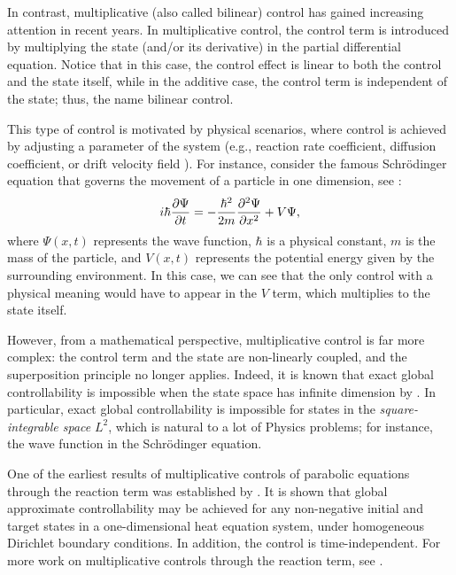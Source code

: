 \documentclass{ifacconf}
\begin{document}
In contrast, multiplicative (also called bilinear) control has gained increasing attention in recent years. In multiplicative control, the control term is introduced by multiplying the state (and/or its derivative) in the partial differential equation. Notice that in this case, the control effect is linear to both the control and the state itself, while in the additive case, the control term is independent of the state; thus, the name bilinear control.

This type of control is motivated by physical scenarios, where control is achieved by adjusting a parameter of the system (e.g., reaction rate coefficient, diffusion coefficient, or drift velocity field ). For instance, consider the famous Schrödinger equation that governs the movement of a particle in one dimension, see \cite{griffiths_introduction_2005}: $$i\hbar \frac{\partial \Psi}{\partial t} = -\frac{\hbar^2}{2m}\frac{\partial ^2\Psi}{\partial x^2} + V\Psi,$$ where $\Psi(x,t)$ represents the wave function, $\hbar$ is a physical constant, $m$ is the mass of the particle, and $V(x,t)$ represents the potential energy given by the surrounding environment. In this case, we can see that the only control with a physical meaning would have to appear in the $V$ term, which multiplies to the state itself.

However, from a mathematical perspective, multiplicative control is far more complex: the control term and the state are non-linearly coupled, and the superposition principle no longer applies. Indeed, it is known that exact global controllability is impossible when the state space has infinite dimension by \cite{ball_controllability_1982}. In particular, exact global controllability is impossible for states in the \textit{square-integrable space} $L^2$, which is natural to a lot of Physics problems; for instance, the wave function in the Schrödinger equation.

One of the earliest results of multiplicative controls of parabolic equations through the reaction term was established by \cite{khapalov_alexander_y_global_2002}. It is shown that global approximate controllability may be achieved for any non-negative initial and target states in a one-dimensional heat equation system, under homogeneous Dirichlet boundary conditions. In addition, the control is time-independent. For more work on multiplicative controls through the reaction term, see \cite{khapalov_global_2010, khayar_controllability_2019, floridia_multiplicative_2020, ouzahra_approximate_2022}.
\end{document}
